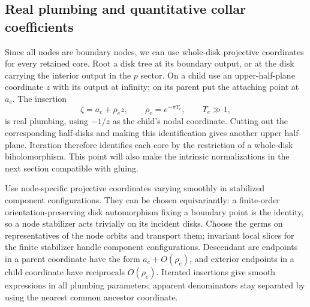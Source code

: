 \documentclass[11pt]{article}
\theoremstyle{definition}
\theoremstyle{remark}
\numberwithin{equation}{section}
\begin{document}
\subsection{Real plumbing and quantitative collar coefficients}

Since all nodes are boundary nodes, we can use whole-disk projective
coordinates for every retained core.  Root a disk tree at its boundary
output, or at the disk carrying the interior output in the $p$ sector.
On a child use an upper-half-plane coordinate $z$ with its output at
infinity; on its parent put the attaching point at $a_e$.  The insertion
\begin{equation}\label{local:plumbing}
 \zeta=a_e+\rho_e z,\qquad \rho_e=e^{-\pi T_e},\qquad T_e\gg1,
\end{equation}
is real plumbing, using $-1/z$ as the child's nodal coordinate.  Cutting
out the corresponding half-disks and making this identification gives
another upper half-plane.  Iteration therefore identifies each core by
the restriction of a whole-disk biholomorphism.  This point will also
make the intrinsic normalizations in the next section compatible with
gluing.

Use node-specific projective coordinates varying smoothly in stabilized
component configurations.  They can be chosen equivariantly: a finite-order
orientation-preserving disk automorphism fixing a boundary point is the
identity, so a node stabilizer acts trivially on its incident disks.
Choose the germs on representatives of the node orbits and transport
them; invariant local slices for the finite stabilizer handle component
configurations.  Descendant arc endpoints in a parent coordinate have
the form $a_e+O(\rho_e)$, and exterior endpoints in a child coordinate
have reciprocals $O(\rho_e)$.  Iterated insertions give smooth expressions
in all plumbing parameters; apparent denominators stay separated by
using the nearest common ancestor coordinate.
\end{document}
